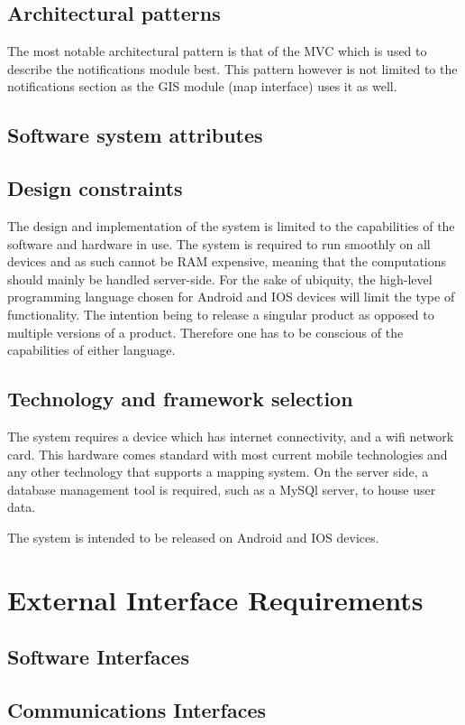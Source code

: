 \documentclass{article}
\begin{document}
		\subsection{Architectural patterns}
		
		The most notable architectural pattern is that of the MVC which is used to describe the notifications module best. This pattern however is not limited to the notifications section as the GIS module (map interface) uses it as well. 
		\subsection{Software system attributes}
		\subsection{Design constraints}
		The design and implementation of the system is limited to the capabilities of the software and hardware in use. The system is required to run smoothly on all devices and as such cannot be RAM expensive, meaning that the computations should mainly be handled server-side. For the sake of ubiquity, the high-level programming language chosen for Android and IOS devices will limit the type of functionality. The intention being to release a singular product as opposed to multiple versions of a product. Therefore one has to be conscious of the capabilities of either language.
		\subsection{Technology and framework selection}
		The system requires a device which has internet connectivity, and a wifi network card. This hardware comes standard with most current mobile technologies and any other technology that supports a mapping system. On the server side, a database management tool is required, such as a MySQl server, to house user data.
		
		The system is intended to be released on Android and IOS devices.
		
		
	\section{External Interface Requirements}
		\subsection{Software Interfaces}
		\subsection{Communications Interfaces}
		
\end{document}
